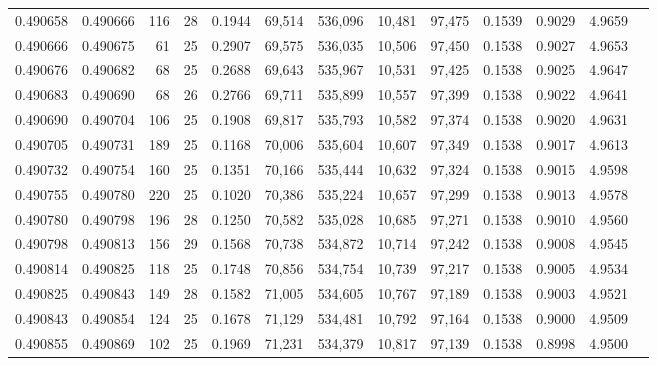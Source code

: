 \begin{tabular}{rrrrrrrrrrrrr}
0.490658 & 0.490666 & 116 &  28 &                                     0.1944 &  69,514 & 536,096 &  10,481 &  97,475 & 0.1539 & 0.9029 & 4.9659 \\
0.490666 & 0.490675 &  61 &  25 &                                     0.2907 &  69,575 & 536,035 &  10,506 &  97,450 & 0.1538 & 0.9027 & 4.9653 \\
0.490676 & 0.490682 &  68 &  25 &                                     0.2688 &  69,643 & 535,967 &  10,531 &  97,425 & 0.1538 & 0.9025 & 4.9647 \\
0.490683 & 0.490690 &  68 &  26 &                                     0.2766 &  69,711 & 535,899 &  10,557 &  97,399 & 0.1538 & 0.9022 & 4.9641 \\
0.490690 & 0.490704 & 106 &  25 &                                     0.1908 &  69,817 & 535,793 &  10,582 &  97,374 & 0.1538 & 0.9020 & 4.9631 \\
0.490705 & 0.490731 & 189 &  25 &                                     0.1168 &  70,006 & 535,604 &  10,607 &  97,349 & 0.1538 & 0.9017 & 4.9613 \\
0.490732 & 0.490754 & 160 &  25 &                                     0.1351 &  70,166 & 535,444 &  10,632 &  97,324 & 0.1538 & 0.9015 & 4.9598 \\
0.490755 & 0.490780 & 220 &  25 &                                     0.1020 &  70,386 & 535,224 &  10,657 &  97,299 & 0.1538 & 0.9013 & 4.9578 \\
0.490780 & 0.490798 & 196 &  28 &                                     0.1250 &  70,582 & 535,028 &  10,685 &  97,271 & 0.1538 & 0.9010 & 4.9560 \\
0.490798 & 0.490813 & 156 &  29 &                                     0.1568 &  70,738 & 534,872 &  10,714 &  97,242 & 0.1538 & 0.9008 & 4.9545 \\
0.490814 & 0.490825 & 118 &  25 &                                     0.1748 &  70,856 & 534,754 &  10,739 &  97,217 & 0.1538 & 0.9005 & 4.9534 \\
0.490825 & 0.490843 & 149 &  28 &                                     0.1582 &  71,005 & 534,605 &  10,767 &  97,189 & 0.1538 & 0.9003 & 4.9521 \\
0.490843 & 0.490854 & 124 &  25 &                                     0.1678 &  71,129 & 534,481 &  10,792 &  97,164 & 0.1538 & 0.9000 & 4.9509 \\
0.490855 & 0.490869 & 102 &  25 &                                     0.1969 &  71,231 & 534,379 &  10,817 &  97,139 & 0.1538 & 0.8998 & 4.9500 \\

\end{tabular}
